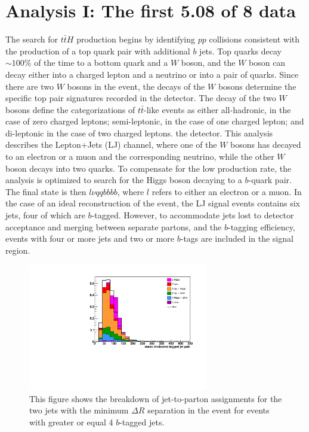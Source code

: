 \chapter{Analysis I: The first 5.08 \fbinv of 8 \TeV data}
\label{analysis_1_overview}

\par The search for $t\bar{t}H$ production begins by identifying $pp$
collisions consistent with the production of a top quark pair with
additional $b$ jets.  Top quarks decay $\sim100\%$ of the time to a
bottom quark and a $W$ boson, and the $W$ boson can decay either into
a charged lepton and a neutrino or into a pair of quarks.  Since there are two $W$ bosons in
the event, the decays of the $W$ bosons determine the specific top
pair signatures recorded in the detector.  The decay of the two $W$
bosons define the categorizations of $t\bar{t}$-like events as either
all-hadronic, in the case of zero charged leptons; semi-leptonic, in
the case of one charged lepton; and di-leptonic in the case of two
charged leptons.  the detector. This analysis describes the
Lepton+Jets (LJ) channel, where one of the $W$ bosons has decayed to an
electron or a muon and the corresponding neutrino, while the other $W$
boson decays into two quarks.  To compensate for the low production
rate, the analysis is optimized to search for the Higgs boson decaying
to a $b$-quark pair.  The final state is then $l \nu qqbbbb$, where
$l$ refers to either an electron or a muon.  In the case of an ideal
reconstruction of the event, the LJ signal events contains six jets,
four of which are $b$-tagged. However, to accommodate jets lost to
detector acceptance and merging between separate partons, and the
$b$-tagging efficiency, events with four or more jets and two or more
$b$-tags are included in the signal region.  

\begin{figure}[h]
  \centering
  \includegraphics[width=0.7\textwidth]{Figures/Analysis_1_Diagrams/h_closestDR_mass_tag_tag_ge4t_rebin.pdf}
  \caption{This figure shows the breakdown of jet-to-parton
   assignments for the two jets with the minimum $\Delta R$
  separation in the event for events with greater or equal 4
  $b$-tagged jets.}\label{fig:tagMassCombinatorics}  
\end{figure}

